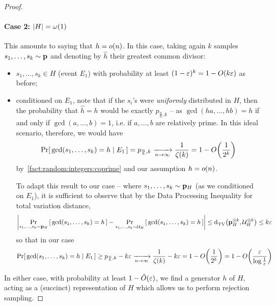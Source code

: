 \begin{proof}
\paragraph{Case 2: $\left\lvert H \right\rvert=\omega(1)$} This amounts to saying that $h=\littleO{n}$. In this case, taking again $k$ samples $s_1,\dots,s_k\sim \mathbf{p}$ and denoting by $\hat{h}$ their greatest common divisor:
\begin{itemize}
  \item $s_1,\dots,s_k\in H$ (event $E_1$) with probability at least $(1-\eps)^k = 1 - \bigO{k\eps}$ as before;
  \item conditioned on $E_1$, note that if the $s_i$'s were \emph{uniformly} distributed in $H$, then the probability that $\hat{h}=h$ would be exactly $p_{\frac{n}{h},k}$ -- as $\gcd(ha,\dots,hb)=h$ if and only if $\gcd(a,\dots,b) =1$, i.e. if $a,\dots,b$ are relatively prime. In this ideal scenario, therefore, we would have
  \[
  \probaCond{ \gcd(s_1,\dots,s_k) = h }{E_1} = p_{\frac{n}{h},k} \xrightarrow[n\to\infty]{} \frac{1}{\zeta(k)} = 1-\bigO{\frac{1}{2^k} }
  \]
  by~\cref{fact:random:integers:coprime} and our assumption $h=\littleO{n}$.
  
  \noindent To adapt this result to our case -- where $s_1,\dots,s_k\sim \mathbf{p}_H$ (as we conditioned on $E_1$), it is sufficient to observe that by the Data Processing Inequality for total variation distance,
  \[
  \left\lvert  \Pr_{s_1,\dots,s_k\sim \mathbf{p}_H}\left[\,  \gcd(s_1,\dots,s_k) = h \, \right] - \Pr_{s_1,\dots,s_k\sim \mathcal{U}_H}\left[\,  \gcd(s_1,\dots,s_k) = h \, \right]  \right\rvert \leq {\operatorname{d}_{\textrm{TV}}^{}\!\left({\ensuremath{\mathbf{p}}_H^{\otimes k}, \ensuremath{\mathcal{U}}_H^{\otimes k}}\right)} \leq k\varepsilon
  \]
  so that in our case 
  \begin{equation}
  \probaCond{ \gcd(s_1,\dots,s_k) = h }{E_1} \geq p_{\frac{n}{h},k} - k\eps \xrightarrow[n\to\infty]{} \frac{1}{\zeta(k)} - k\eps = 1-\bigO{\frac{1}{2^k}} = 1-\bigO{\frac{\eps}{\log\frac{1}{\eps}}}
  \end{equation}
\end{itemize}

In either case, with probability at least $1-\tildeO{\eps}$, we find a generator $h$ of $H$, acting as a (succinct) representation of $H$ which allows us to perform rejection sampling.
\end{proof}
 
